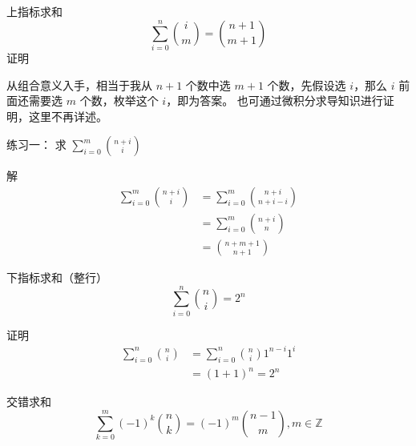 \documentclass[UTF8]{beamer}
\begin{document}
    \begin{frame}
      \begin{block}{上指标求和}
        $$
        \sum\limits_{i=0}^{n}{i \choose m}={n+1 \choose m+1}
        $$
        \pause
        证明

        从组合意义入手，相当于我从 \(n+1\) 个数中选 \(m+1\) 个数，先假设选
        \(i\)，那么 \(i\) 前面还需要选 \(m\) 个数，枚举这个 \(i\)，即为答案。
        也可通过微积分求导知识进行证明，这里不再详述。
      \end{block}
    \end{frame}

    \begin{frame}
      \begin{block}{练习一：}
        求 \(\sum\limits_{i=0}^{m}{n+i \choose i}\)
      \end{block}
      \pause
      解
      \[
      \begin{aligned}
        \sum\limits_{i=0}^{m}{n+i \choose i}&=\sum\limits_{i=0}^{m}{n+i \choose n+i-i} \\
        &=\sum\limits_{i=0}^{m}{n+i \choose n} \\
        &={n+m+1 \choose n+1}
      \end{aligned}
      \]
    \end{frame}

    \begin{frame}
      \begin{block}{下指标求和（整行）}
        \[
        \sum\limits_{i=0}^{n}{n \choose i}=2^n
        \]
      \end{block}
      \pause
      证明
      \[
      \begin{aligned}
        \sum\limits_{i=0}^{n}{n \choose i}&=\sum\limits_{i=0}^{n}{n \choose i}1^{n-i}1^i \\
        &=(1+1)^n=2^n
      \end{aligned}
      \]
      \pause
      \begin{block}{交错求和}
        \[
        \sum\limits_{k=0}^{m}(-1)^k{n \choose k}=(-1)^m{n-1 \choose m},m\in \mathbb{Z}
        \] 
      \end{block}
    \end{frame}
\end{document}
